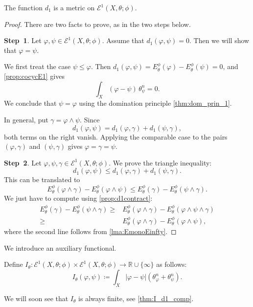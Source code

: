 \begin{lemma}\label{lma:d1metric}
    The function $d_1$ is a metric on $\mathcal{E}^1(X,\theta;\phi)$.
\end{lemma}
\begin{proof}
    There are two facts to prove, as in the two steps below.

    \textbf{Step~1}. Let $\varphi,\psi\in \mathcal{E}^1(X,\theta;\phi)$. Assume that $d_1(\varphi,\psi)=0$. Then we will show that $\varphi=\psi$.

    We first treat the case $\psi\leq \varphi$. Then $d_1(\varphi,\psi)=E_\theta^\phi(\varphi)-E_\theta^\phi(\psi)=0$, and \cref{prop:cocycE1} gives
    \[
    \int_X (\varphi-\psi)\,\theta_{\psi}^n=0.
    \]
    We conclude that $\psi=\varphi$ using the domination principle \cref{thm:dom_prin_1}.

    In general, put $\gamma=\varphi\land\psi$. Since
    \[
    d_1(\varphi,\psi)=d_1(\varphi,\gamma)+d_1(\psi,\gamma),
    \]
    both terms on the right vanish. Applying the comparable case to the pairs $(\varphi,\gamma)$ and $(\psi,\gamma)$ gives $\varphi=\gamma=\psi$.

    \textbf{Step~2}. Let $\varphi,\psi,\gamma\in \mathcal{E}^1(X,\theta;\phi)$. We prove the triangle inequality:
    \[
    d_1(\varphi,\psi)\leq d_1(\varphi,\gamma)+d_1(\psi,\gamma).
    \]
    This can be translated to
    \[
    E_{\theta}^{\phi}(\varphi\land \gamma)-E_{\theta}^{\phi}(\varphi\land \psi)\leq E_{\theta}^{\phi}(\gamma)-E_{\theta}^{\phi}(\psi\land \gamma).
    \]
    We just have to compute using \cref{prop:d1contract}:
    \[
    \begin{aligned}
        E_{\theta}^{\phi}(\gamma)-E_{\theta}^{\phi}(\psi\land \gamma)\geq & E_{\theta}^{\phi}(\varphi\land \gamma)-E_{\theta}^{\phi}(\varphi\land \psi\land \gamma)\\
        \geq &E_{\theta}^{\phi}(\varphi\land \gamma)-E_{\theta}^{\phi}(\varphi\land \psi),
    \end{aligned}
    \]
    where the second line follows from \cref{lma:EmonoEinfty}.
\end{proof}


We introduce an auxiliary functional.
\begin{definition}\label{def:Itheta}
    Define $I_{\theta}\colon \mathcal{E}^1(X,\theta;\phi)\times \mathcal{E}^1(X,\theta;\phi)\rightarrow \mathbb{R}\cup \{\infty\}$ as follows:
    \begin{equation}
        I_{\theta}(\varphi,\psi)\coloneqq \int_X |\varphi-\psi|\left( \theta_{\varphi}^n+\theta_{\psi}^n \right).
    \end{equation}
\end{definition}
We will soon see that $I_{\theta}$ is always finite, see \cref{thm:I_d1_comp}.

